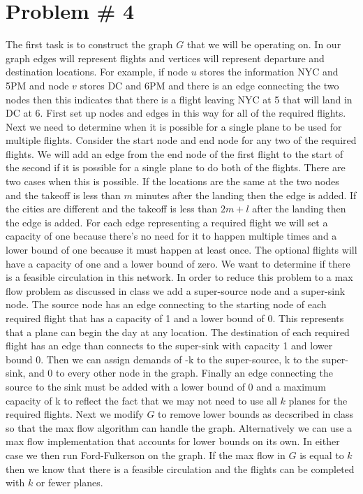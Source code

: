 \documentclass{article}
\begin{document}
\section*{Problem \# 4}
The first task is to construct the graph $G$ that we will be operating on. In our graph edges will represent flights and vertices will represent departure and destination locations. For example, if node $u$ stores the information NYC and 5PM and node $v$ stores DC and 6PM and there is an edge connecting the two nodes then this indicates that there is a flight leaving NYC at 5 that will land in DC at 6. First set up nodes and edges in this way for all of the required flights. Next we need to determine when it is possible for a single plane to be used for multiple flights. Consider the start node and end node for any two of the required flights. We will add an edge from the end node of the first flight to the start of the second if it is possible for a single plane to do both of the flights. There are two cases when this is possible. If the locations are the same at the two nodes and the takeoff is less than $m$ minutes after the landing then the edge is added. If the cities are different and the takeoff is less than $2m + l$ after the landing then the edge is added. For each edge representing a required flight we will set a capacity of one because there's no need for it to happen multiple times and a lower bound of one because it must happen at least once. The optional flights will have a capacity of one and a lower bound of zero. We want to determine if there is a feasible circulation in this network. In order to reduce this problem to a max flow problem as discussed in class we add a super-source node and a super-sink node. The source node has an edge connecting to the starting node of each required flight that has a capacity of 1 and a lower bound of 0. This represents that a plane can begin the day at any location. The destination of each required flight has an edge than connects to the super-sink with capacity 1 and lower bound 0. Then we can assign demands of -k to the super-source, k to the super-sink, and 0 to every other node in the graph. Finally an edge connecting the source to the sink must be added with a lower bound of 0 and a maximum capacity of k to reflect the fact that we may not need to use all $k$ planes for the required flights. Next we modify $G$ to remove lower bounds as decscribed in class so that the max flow algorithm can handle the graph. Alternatively we can use a max flow implementation that accounts for lower bounds on its own. In either case we then run Ford-Fulkerson on the graph. If the max flow in $G$ is equal to $k$ then we know that there is a feasible circulation and the flights can be completed with $k$ or fewer planes. 
\end{document}
